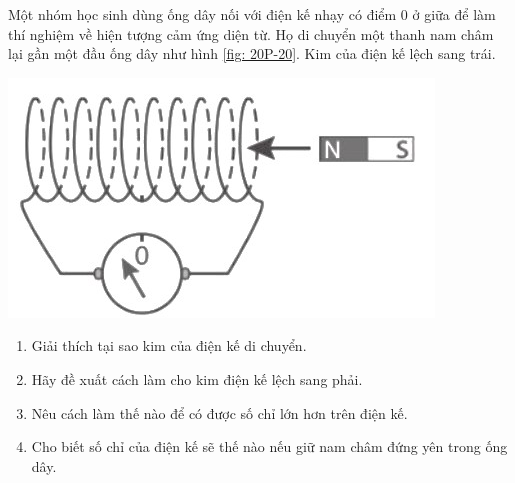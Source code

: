 \begin{ex}
	Một nhóm học sinh dùng ống dây nối với điện kế nhạy có điểm 0 ở giữa để làm thí nghiệm về hiện tượng cảm ứng diện từ. Họ di chuyển một thanh nam châm lại gần một đầu ống dây như hình \ref{fig: 20P-20}. Kim của điện kế lệch sang trái.
	\begin{center}
		\includegraphics[width=0.3\linewidth]{figs/VN12-Y24-PH-SYL-020P-20}
		\label{fig: 20P-20}
	\end{center}
	\begin{enumerate}[label=\alph*)]
		\item Giải thích tại sao kim của điện kế di chuyển.
		\item Hãy đề xuất cách làm cho kim điện kế lệch sang phải.
		\item Nêu cách làm thế nào để có được số chỉ lớn hơn trên điện kế.
		\item Cho biết số chỉ của điện kế sẽ thế nào nếu giữ nam châm đứng yên trong ống dây.
	\end{enumerate}
\end{ex}

